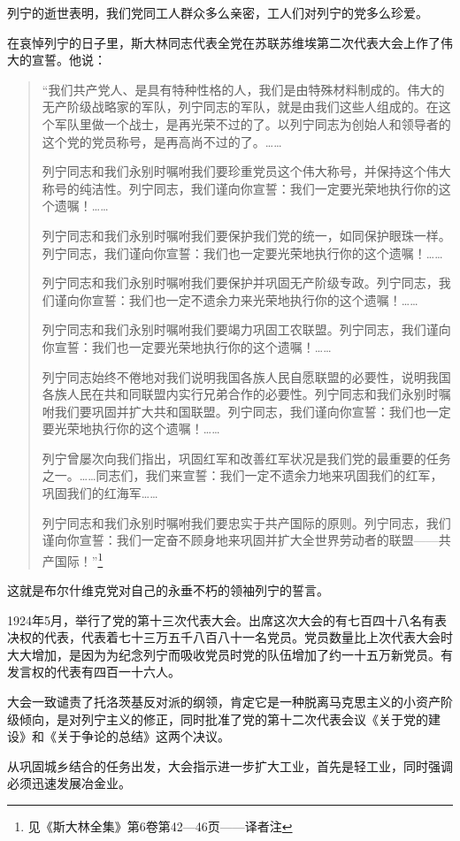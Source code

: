 列宁的逝世表明，我们党同工人群众多么亲密，工人们对列宁的党多么珍爱。

在哀悼列宁的日子里，斯大林同志代表全党在苏联苏维埃第二次代表大会上作了伟大的宣誓。他说：

\begin{quotation}
“我们共产党人、是具有特种性格的人，我们是由特殊材料制成的。伟大的无产阶级战略家的军队，列宁同志的军队，就是由我们这些人组成的。在这个军队里做一个战士，是再光荣不过的了。以列宁同志为创始人和领导者的这个党的党员称号，是再高尚不过的了。……

列宁同志和我们永别时嘱咐我们要珍重党员这个伟大称号，并保持这个伟大称号的纯洁性。列宁同志，我们谨向你宣誓：我们一定要光荣地执行你的这个遗嘱！……

列宁同志和我们永别时嘱咐我们要保护我们党的统一，如同保护眼珠一样。列宁同志，我们谨向你宣誓：我们也一定要光荣地执行你的这个遗嘱！……

列宁同志和我们永别时嘱咐我们要保护并巩固无产阶级专政。列宁同志，我们谨向你宣誓：我们也一定不遗余力来光荣地执行你的这个遗嘱！……

列宁同志和我们永别时嘱咐我们要竭力巩固工农联盟。列宁同志，我们谨向你宣誓：我们也一定要光荣地执行你的这个遗嘱！……

列宁同志始终不倦地对我们说明我国各族人民自愿联盟的必要性，说明我国各族人民在共和同联盟内实行兄弟合作的必要性。列宁同志和我们永别时嘱咐我们要巩固并扩大共和国联盟。列宁同志，我们谨向你宣誓：我们也一定要光荣地执行你的这个遗嘱！……

列宁曾屡次向我们指出，巩固红军和改善红军状况是我们党的最重要的任务之一。……同志们，我们来宣誓：我们一定不遗余力地来巩固我们的红军，巩固我们的红海军……

列宁同志和我们永别时嘱咐我们要忠实于共产国际的原则。列宁同志，我们谨向你宣誓：我们一定奋不顾身地来巩固并扩大全世界劳动者的联盟——共产国际！”\footnote{见《斯大林全集》第6卷第42—46页——译者注}
\end{quotation}

这就是布尔什维克党对自己的永垂不朽的领袖列宁的誓言。

1924年5月，举行了党的第十三次代表大会。出席这次大会的有七百四十八名有表决权的代表，代表着七十三万五千八百八十一名党员。党员数量比上次代表大会时大大增加，是因为为纪念列宁而吸收党员时党的队伍增加了约一十五万新党员。有发言权的代表有四百一十六人。

大会一致谴责了托洛茨基反对派的纲领，肯定它是一种脱离马克思主义的小资产阶级倾向，是对列宁主义的修正，同时批准了党的第十二次代表会议《关于党的建设》和《关于争论的总结》这两个决议。

从巩固城乡结合的任务出发，大会指示进一步扩大工业，首先是轻工业，同时强调必须迅速发展冶金业。


